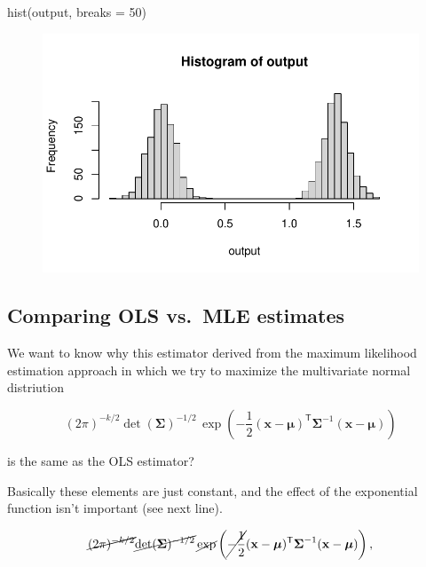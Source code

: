 \documentclass[
  letterpaper,
  DIV=11,
  numbers=noendperiod]{scrreport}
\newenvironment{Shaded}{\begin{snugshade}}{\end{snugshade}}
\newcommand{\AttributeTok}[1]{\textcolor[rgb]{0.40,0.45,0.13}{#1}}
\newcommand{\DecValTok}[1]{\textcolor[rgb]{0.68,0.00,0.00}{#1}}
\newcommand{\FunctionTok}[1]{\textcolor[rgb]{0.28,0.35,0.67}{#1}}
\newcommand{\NormalTok}[1]{\textcolor[rgb]{0.00,0.23,0.31}{#1}}
\begin{document}
\begin{Shaded}
\begin{Highlighting}[]
\FunctionTok{hist}\NormalTok{(output, }\AttributeTok{breaks =} \DecValTok{50}\NormalTok{)}
\end{Highlighting}
\end{Shaded}

\begin{figure}[H]

{\centering \includegraphics{week2/week2_files/figure-pdf/unnamed-chunk-12-3.pdf}

}

\end{figure}

\hypertarget{comparing-ols-vs.-mle-estimates}{%
\subsection{Comparing OLS vs.~MLE
estimates}\label{comparing-ols-vs.-mle-estimates}}

We want to know why this estimator derived from the maximum likelihood
estimation approach in which we try to maximize the multivariate normal
distriution

\[{\displaystyle (2\pi )^{-k/2}\det({\boldsymbol {\Sigma }})^{-1/2}\,\exp \left(-{\frac {1}{2}}(\mathbf {x} -{\boldsymbol {\mu }})^{\mathsf {T}}{\boldsymbol {\Sigma }}^{-1}(\mathbf {x} -{\boldsymbol {\mu }})\right)}\]

is the same as the OLS estimator?

Basically these elements are just constant, and the effect of the
exponential function isn't important (see next line).

\[{\cancel{\displaystyle (2\pi )^{-k/2}}\cancel{\det({\boldsymbol {\Sigma }})^{-1/2}}\,\cancel{\exp} \left(\cancel{-{\frac {1}{2}}}(\mathbf {x} -{\boldsymbol {\mu }})^{\mathsf {T}}{\boldsymbol {\Sigma }}^{-1}(\mathbf {x} -{\boldsymbol {\mu }})\right),}\]
\end{document}
